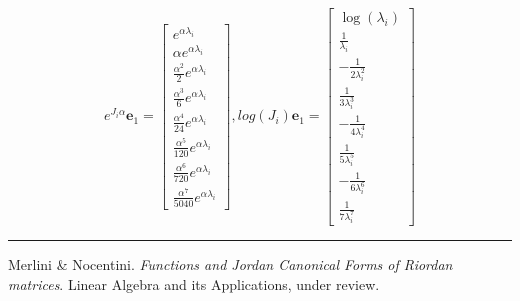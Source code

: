 \documentclass[9pt]{beamer}
\begin{document}
\begin{frame}[fragile]
\begin{displaymath}
e^{J_{i} \alpha} \boldsymbol{e}_{1} = \left[\begin{matrix}e^{\alpha \lambda_{i}}\\\alpha e^{\alpha \lambda_{i}}\\\frac{\alpha^{2}}{2} e^{\alpha \lambda_{i}}\\\frac{\alpha^{3}}{6} e^{\alpha \lambda_{i}}\\\frac{\alpha^{4}}{24} e^{\alpha \lambda_{i}}\\\frac{\alpha^{5}}{120} e^{\alpha \lambda_{i}}\\\frac{\alpha^{6}}{720} e^{\alpha \lambda_{i}}\\\frac{\alpha^{7}}{5040} e^{\alpha \lambda_{i}}\end{matrix}\right],
log{\left (J_{i} \right )} \boldsymbol{e}_{1} = \left[\begin{matrix}\log{\left (\lambda_{i} \right )}\\\frac{1}{\lambda_{i}}\\- \frac{1}{2 \lambda_{i}^{2}}\\\frac{1}{3 \lambda_{i}^{3}}\\- \frac{1}{4 \lambda_{i}^{4}}\\\frac{1}{5 \lambda_{i}^{5}}\\- \frac{1}{6 \lambda_{i}^{6}}\\\frac{1}{7 \lambda_{i}^{7}}\end{matrix}\right]
\end{displaymath}
\vfill
\noindent\rule{\textwidth}{0.1pt}
{\footnotesize
Merlini \& Nocentini. \textit{Functions and Jordan Canonical Forms of Riordan
matrices}. \newline Linear Algebra and its Applications, under review.}
\end{frame}
\end{document}
